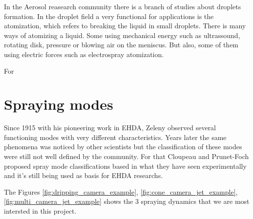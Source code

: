 In the Aerosol reasearch community there is a branch of studies about droplets formation. In the droplet field a very functional for applications is the atomization, which refers to breaking the liquid in small droplets.
There is many ways of atomizing a liquid. Some using mechanical energy such as ultrassound, rotating disk\cite{Disk_atomization}, pressure or blowing air on the meniscus. But also, some of them using electric forces such as electrospray atomization.

For 

\section{Spraying modes}
\label{sec:spraying_modes_subsec}

Since 1915 with his pioneering work in EHDA, Zeleny observed several functioning modes with very different characteristics.
Years later the same phenomena was noticed by other scientists but the classification of these modes were still not well defined by the community.
For that Cloupeau and Prunet-Foch proposed spray mode classifications based in what they have seen experimentally and it's still being used as basis for EHDA researchs.\cite{prunet}

The Figures \ref{fig:dripping_camera_example}, \ref{fig:cone_camera_jet_example}, \ref{fig:multi_camera_jet_example} shows the 3 spraying dynamics that we are most intersted in this project. 

